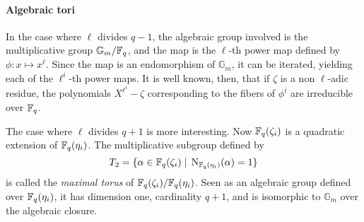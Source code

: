 \documentclass{sig-alternate}
\begin{document}
\paragraph{Algebraic tori}
In the case where $\ell$ divides $q-1$, the algebraic group involved
is the multiplicative group $\mathbb{G}_m/\mathbb{F}_q$, and the map is the
$\ell$-th power map defined by $\phi:x\mapsto x^\ell$. Since the map
is an endomorphism of $\mathbb{G}_m$, it can be iterated, yielding
each of the $\ell^i$-th power maps. It is well known, then, that if
$\zeta$ is a non $\ell$-adic residue, the polynomials
$X^{\ell^i}-\zeta$ corresponding to the fibers of $\phi^i$ are
irreducible over $\mathbb{F}_q$.

The case where $\ell$ divides $q+1$ is more interesting. Now
$\mathbb{F}_q(\zeta_i)$ is a quadratic extension of $\mathbb{F}_q(\eta_i)$. The
multiplicative subgroup defined by
\begin{equation}
  \label{eq:T2-def}
  T_2 = \{\alpha\in\mathbb{F}_q(\zeta_i) \;|\; \operatorname{N}_{\mathbb{F}_q(\eta_i)}(\alpha) = 1\}
\end{equation}
is called the \emph{maximal torus} of
$\mathbb{F}_q(\zeta_i)/\mathbb{F}_q(\eta_i)$. Seen as an algebraic group defined over
$\mathbb{F}_q(\eta_i)$, it has dimension one, cardinality $q+1$, and is
isomorphic to $\mathbb{G}_m$ over the algebraic closure.
\end{document}
